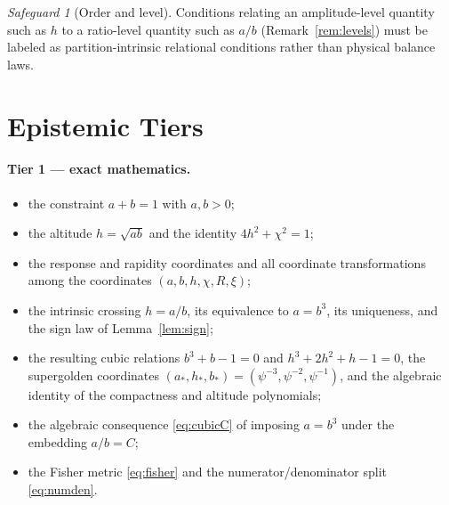 \documentclass[11pt,a4paper]{article}
\theoremstyle{definition}
\theoremstyle{plain}
\theoremstyle{remark}
\newtheorem{safeguard}[definition]{Safeguard}
\newcommand{\Rresp}{R}
\begin{document}
\begin{safeguard}[Order and level]
Conditions relating an amplitude-level quantity such as $h$ to a ratio-level
quantity such as $a/b$ (Remark~\ref{rem:levels}) must be labeled as
partition-intrinsic relational conditions rather than physical balance laws.
\end{safeguard}

\section{Epistemic Tiers}
\label{sec:tiers}

\paragraph{Tier 1 --- exact mathematics.}
\begin{itemize}[leftmargin=*,itemsep=1pt]
\item the constraint $a+b=1$ with $a,b>0$;
\item the altitude $h=\sqrt{ab}$ and the identity $4h^{2}+\chi^{2}=1$;
\item the response and rapidity coordinates and all coordinate transformations
      among the coordinates $(a,b,h,\chi,\Rresp,\xi)$;
\item the intrinsic crossing $h=a/b$, its equivalence to $a=b^{3}$, its
      uniqueness, and the sign law of Lemma~\ref{lem:sign};
\item the resulting cubic relations $b^{3}+b-1=0$ and $h^{3}+2h^{2}+h-1=0$,
      the supergolden coordinates
      $(a_{*},h_{*},b_{*})=(\psi^{-3},\psi^{-2},\psi^{-1})$, and the algebraic
      identity of the compactness and altitude polynomials;
\item the algebraic consequence \eqref{eq:cubicC} of imposing $a=b^{3}$ under
      the embedding $a/b=C$;
\item the Fisher metric \eqref{eq:fisher} and the numerator/denominator split
      \eqref{eq:numden}.
\end{itemize}
\end{document}
